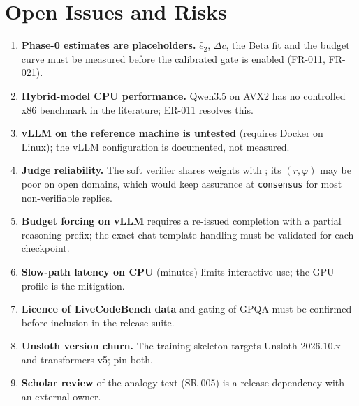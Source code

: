 \documentclass[11pt,a4paper]{article}
\begin{document}
\section{Open Issues and Risks}
\label{sec:open}
\begin{enumerate}
\item \textbf{Phase-0 estimates are placeholders.} $\hat e_2$, $\Delta c$, the Beta fit and the budget curve must be measured before the calibrated gate is enabled (FR-011, FR-021).
\item \textbf{Hybrid-model CPU performance.} Qwen3.5 on AVX2 has no controlled x86 benchmark in the literature; ER-011 resolves this.
\item \textbf{vLLM on the reference machine is untested} (requires Docker on Linux); the vLLM configuration is documented, not measured.
\item \textbf{Judge reliability.} The soft verifier shares weights with \Stwo; its $(r,\varphi)$ may be poor on open domains, which would keep assurance at \texttt{consensus} for most non-verifiable replies.
\item \textbf{Budget forcing on vLLM} requires a re-issued completion with a partial reasoning prefix; the exact chat-template handling must be validated for each checkpoint.
\item \textbf{Slow-path latency on CPU} (minutes) limits interactive use; the GPU profile is the mitigation.
\item \textbf{Licence of LiveCodeBench data} and gating of GPQA must be confirmed before inclusion in the release suite.
\item \textbf{Unsloth version churn.} The training skeleton targets Unsloth 2026.10.x and transformers v5; pin both.
\item \textbf{Scholar review} of the analogy text (SR-005) is a release dependency with an external owner.
\end{enumerate}
\end{document}
